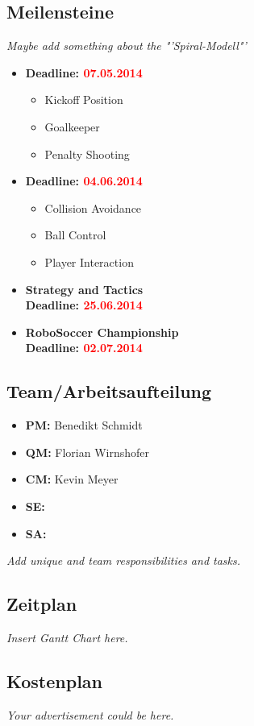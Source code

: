 \documentclass[12pt]{article}
\begin{document}
\subsection{Meilensteine}
\textit{Maybe add something about the "'Spiral-Modell"'}
\begin{itemize}
	\item \textbf{Deadline: \textcolor{red}{07.05.2014}}
	\begin{itemize}
		\item Kickoff Position
		\item Goalkeeper
		\item Penalty Shooting
	\end{itemize}
	
	\item \textbf{Deadline: \textcolor{red}{04.06.2014}}
	\begin{itemize}
		\item Collision Avoidance
		\item Ball Control
		\item Player Interaction
	\end{itemize}
	
	\item \textbf{Strategy and Tactics}\\
	\textbf{Deadline: \textcolor{red}{25.06.2014}}
	
	\item \textbf{RoboSoccer Championship}\\
	\textbf{Deadline: \textcolor{red}{02.07.2014}}
\end{itemize}

\subsection{Team/Arbeitsaufteilung}

\begin{itemize}
	\item \textbf{PM:} Benedikt Schmidt
	\item \textbf{QM:} Florian Wirnshofer
	\item \textbf{CM:} Kevin Meyer
	\item \textbf{SE:} 
	\item \textbf{SA:} 
\end{itemize}
\textit{Add unique and team responsibilities and tasks.}

\subsection{Zeitplan}
\textit{Insert Gantt Chart here.}

\subsection{Kostenplan}
\textit{Your advertisement could be here.}
\end{document}
